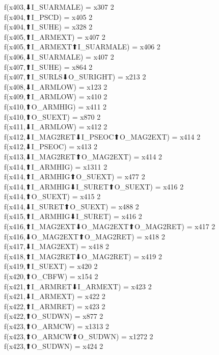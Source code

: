 f(x403,⬇I_SUARMALE) = x307 {2} \\
f(x404,⬆I_PSCD) = x405 {2} \\
f(x404,⬆I_SUHE) = x328 {2} \\
f(x405,⬆I_ARMEXT) = x407 {2} \\
f(x405,⬆I_ARMEXT⬆I_SUARMALE) = x406 {2} \\
f(x406,⬇I_SUARMALE) = x407 {2} \\
f(x407,⬆I_SUHE) = x864 {2} \\
f(x407,⬆I_SURLS⬇O_SURIGHT) = x213 {2} \\
f(x408,⬇I_ARMLOW) = x123 {2} \\
f(x409,⬆I_ARMLOW) = x410 {2} \\
f(x410,⬆O_ARMHIG) = x411 {2} \\
f(x410,⬆O_SUEXT) = x870 {2} \\
f(x411,⬇I_ARMLOW) = x412 {2} \\
f(x412,⬇I_MAG2RET⬇I_PSEOC⬆O_MAG2EXT) = x414 {2} \\
f(x412,⬇I_PSEOC) = x413 {2} \\
f(x413,⬇I_MAG2RET⬆O_MAG2EXT) = x414 {2} \\
f(x414,⬆I_ARMHIG) = x1311 {2} \\
f(x414,⬆I_ARMHIG⬆O_SUEXT) = x477 {2} \\
f(x414,⬆I_ARMHIG⬇I_SURET⬆O_SUEXT) = x416 {2} \\
f(x414,⬆O_SUEXT) = x415 {2} \\
f(x414,⬇I_SURET⬆O_SUEXT) = x488 {2} \\
f(x415,⬆I_ARMHIG⬇I_SURET) = x416 {2} \\
f(x416,⬆I_MAG2EXT⬇O_MAG2EXT⬆O_MAG2RET) = x417 {2} \\
f(x416,⬇O_MAG2EXT⬆O_MAG2RET) = x418 {2} \\
f(x417,⬇I_MAG2EXT) = x418 {2} \\
f(x418,⬆I_MAG2RET⬇O_MAG2RET) = x419 {2} \\
f(x419,⬆I_SUEXT) = x420 {2} \\
f(x420,⬆O_CBFW) = x154 {2} \\
f(x421,⬆I_ARMRET⬇I_ARMEXT) = x423 {2} \\
f(x421,⬇I_ARMEXT) = x422 {2} \\
f(x422,⬆I_ARMRET) = x423 {2} \\
f(x422,⬆O_SUDWN) = x877 {2} \\
f(x423,⬆O_ARMCW) = x1313 {2} \\
f(x423,⬆O_ARMCW⬆O_SUDWN) = x1272 {2} \\
f(x423,⬆O_SUDWN) = x424 {2} \\
